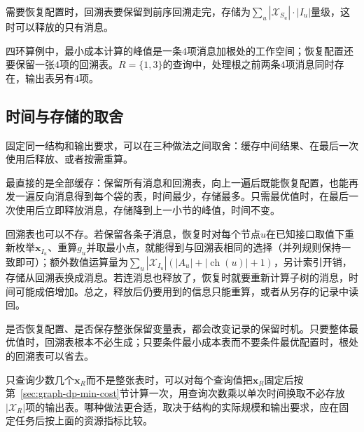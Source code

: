 需要恢复配置时，回溯表要保留到前序回溯走完，存储为$\sum_u|\mathcal X_{S_u}|\cdot|I_u|$量级，这时可以释放的只有消息。

四环算例中，最小成本计算的峰值是一条$4$项消息加根处的工作空间；恢复配置还要保留一张$4$项的回溯表。$R=\{1,3\}$的查询中，处理根之前两条$4$项消息同时存在，输出表另有$4$项。

\subsection{时间与存储的取舍}
\label{sec:graph-dp-time-memory-tradeoff}

固定同一结构和输出要求，可以在三种做法之间取舍：缓存中间结果、在最后一次使用后释放、或者按需重算。

最直接的是全部缓存：保留所有消息和回溯表，向上一遍后既能恢复配置，也能再发一遍反向消息得到每个袋的表，时间最少，存储最多。只需最优值时，在最后一次使用后立即释放消息，存储降到上一小节的峰值，时间不变。

回溯表也可以不存。若保留各条子消息，恢复时对每个节点$u$在已知接口取值下重新枚举$\bm x_{I_u}$、重算$g_u$并取最小点，就能得到与回溯表相同的选择（并列规则保持一致即可）；额外数值运算量为$\sum_u|\mathcal X_{I_u}|(|A_u|+|\operatorname{ch}(u)|+1)$，另计索引开销，存储从回溯表换成消息。若连消息也释放了，恢复时就要重新计算子树的消息，时间可能成倍增加。总之，释放后仍要用到的信息只能重算，或者从另存的记录中读回。

是否恢复配置、是否保存整张保留变量表，都会改变记录的保留时机。只要整体最优值时，回溯表根本不必生成；只要条件最小成本表而不要条件最优配置时，根处的回溯表可以省去。

只查询少数几个$\bm x_R$而不是整张表时，可以对每个查询值把$\bm x_R$固定后按第~\ref{sec:graph-dp-min-cost}节计算一次，用查询次数乘以单次时间换取不必存放$|\mathcal X_R|$项的输出表。哪种做法更合适，取决于结构的实际规模和输出要求，应在固定任务后按上面的资源指标比较。
